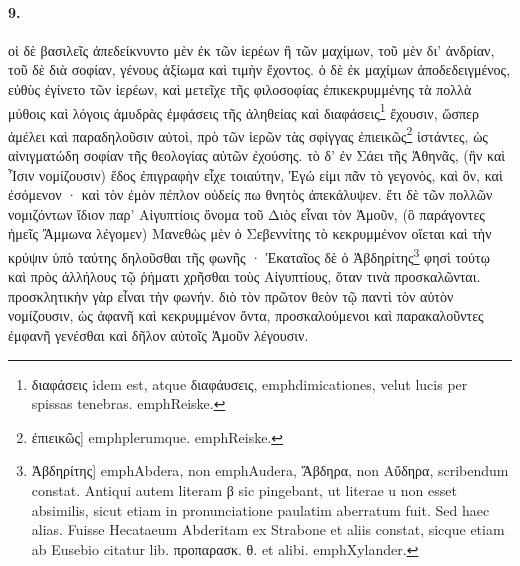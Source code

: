 \documentclass[a4paper, 11pt, oneside, polutonikogreek, german]{article}
\begin{document}
\paragraph{9.}
οἱ δὲ βασιλεῖς ἀπεδείκνυντο μὲν ἐκ τῶν ἱερέων ἢ τῶν μαχίμων, τοῦ μὲν δι' ἀνδρίαν, τοῦ δὲ διὰ σοφίαν, γένους ἀξίωμα καὶ τιμὴν ἔχοντος. ὁ δὲ ἐκ μαχίμων ἀποδεδειγμένος, εὐθὺς ἐγίνετο τῶν ἱερέων, καὶ μετεῖχε τῆς φιλοσοφίας ἐπικεκρυμμένης τὰ πολλὰ μύθοις καὶ λόγοις ἀμυδρὰς ἐμφάσεις τῆς ἀληθείας καὶ διαφάσεις\footnote{διαφάσεις idem est, atque διαφάυσεις, emph{dimicationes}, velut lucis per spissas tenebras. emph{Reiske.}} ἔχουσιν, ὥσπερ ἀμέλει καὶ παραδηλοῦσιν αὐτοὶ, πρὸ τῶν ἱερῶν τὰς σφίγγας ἐπιεικῶς\footnote{ἐπιεικῶς] emph{plerumque.} emph{Reiske.}} ἱστάντες, ὡς αἰνιγματώδη σοφίαν τῆς θεολογίας αὐτῶν ἐχούσης. τὸ δ' ἐν Σάει τῆς Ἀθηνᾶς, (ἣν καὶ Ἶσιν νομίζουσιν) ἕδος ἐπιγραφὴν εἶχε τοιαύτην, Ἐγώ εἰμι πᾶν τὸ γεγονὸς, καὶ ὂν, καὶ ἐσόμενον · καὶ τὸν ἐμὸν πέπλον οὐδείς πω θνητὸς ἀπεκάλυψεν. ἔτι δὲ τῶν πολλῶν νομιζόντων ἴδιον παρ' Αἰγυπτίοις ὄνομα τοῦ Διὸς εἶναι τὸν Ἀμοῦν, (ὃ παράγοντες ἡμεῖς Ἄμμωνα λέγομεν) Μανεθὼς μὲν ὁ Σεβεννίτης τὸ κεκρυμμένον οἴεται καὶ τὴν κρύψιν ὑπὸ ταύτης δηλοῦσθαι τῆς φωνῆς · Ἑκαταῖος δὲ ὁ Ἀβδηρίτης\footnote{Ἀβδηρίτης] emph{Abdera}, non emph{Audera}, Ἄβδηρα, non Αὔδηρα, scribendum constat. Antiqui autem literam β sic pingebant, ut literae u non esset absimilis, sicut etiam in pronunciatione paulatim aberratum fuit. Sed haec alias. Fuisse Hecataeum Abderitam ex Strabone et aliis constat, sicque etiam ab Eusebio citatur lib. προπαρασκ. θ. et alibi. emph{Xylander.}} φησὶ τούτῳ καὶ πρὸς ἀλλήλους τῷ ῥήματι χρῆσθαι τοὺς Αἰγυπτίους, ὅταν τινὰ προσκαλῶνται. προσκλητικὴν γὰρ εἶναι τὴν φωνήν. διὸ τὸν πρῶτον θεὸν τῷ παντὶ τὸν αὐτὸν νομίζουσιν, ὡς ἀφανῆ καὶ κεκρυμμένον ὄντα, προσκαλούμενοι καὶ παρακαλοῦντες ἐμφανῆ γενέσθαι καὶ δῆλον αὐτοῖς Ἀμοῦν λέγουσιν.
\end{document}
